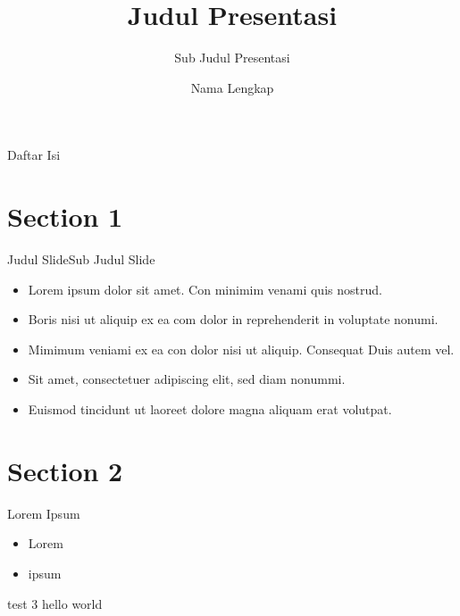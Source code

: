 \documentclass[aspectratio=169]{beamer}
\title{Judul Presentasi}
\subtitle{Sub Judul Presentasi}
\author{Nama Lengkap}
\begin{document}
\begin{frame}[plain]
  \titlepage
\end{frame}


\begin{frame}{Daftar Isi}
  \tableofcontents
\end{frame}


\section{Section 1}

\begin{frame}{Judul Slide}{Sub Judul Slide}
  \begin{itemize}
    \item Lorem ipsum dolor sit amet. Con minimim venami quis nostrud.
    \item Boris nisi ut aliquip ex ea com dolor in reprehenderit in voluptate nonumi.
    \item Mimimum veniami ex ea con dolor nisi ut aliquip. Consequat Duis autem vel.
    \item Sit amet, consectetuer adipiscing elit, sed diam nonummi.
    \item Euismod tincidunt ut laoreet dolore magna aliquam erat volutpat.
  \end{itemize}
\end{frame}

\section{Section 2}
\begin{frame}{Lorem Ipsum}{}
  \begin{itemize}
    \item Lorem
    \item ipsum
  \end{itemize}
\end{frame}

\begin{frame}{test 3}{}
  hello world
\end{frame}
\end{document}
